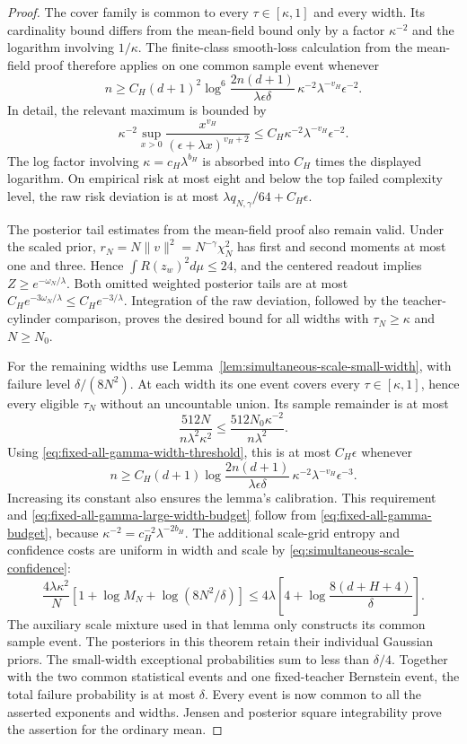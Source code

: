 \begin{proof}
The cover family is common to every $\tau\in[\kappa,1]$ and every
width.  Its cardinality bound differs from the mean-field bound only
by a factor $\kappa^{-2}$ and the logarithm involving $1/\kappa$.
The finite-class smooth-loss calculation from the mean-field proof
therefore applies on one common sample event whenever
\begin{equation}
 n\geq C_H(d+1)^2
    \log^6\!\frac{2n(d+1)}{\lambda\epsilon\delta}\,
                  \kappa^{-2}\lambda^{-v_H}\epsilon^{-2}.
 \label{eq:fixed-all-gamma-large-width-budget}
\end{equation}
In detail, the relevant maximum is bounded by
\[
 \kappa^{-2}\sup_{x>0}
       \frac{x^{v_H}}{(\epsilon+\lambda x)^{v_H+2}}
       \leq C_H\kappa^{-2}\lambda^{-v_H}\epsilon^{-2}.
\]
The log factor involving $\kappa=c_H\lambda^{b_H}$ is absorbed into
$C_H$ times the displayed logarithm.
On empirical risk at most eight and below the top failed complexity
level, the raw risk deviation is at most
$\lambda q_{N,\gamma}/64+C_H\epsilon$.

The posterior tail estimates from the mean-field proof also remain
valid.  Under the scaled prior,
$r_N=N\|v\|^2=N^{-\gamma}\chi_N^2$ has first and second moments
at most one and three.  Hence $\int R(z_w)^2d\mu\leq24$, and the
centered readout implies $Z\geq e^{-\omega_N/\lambda}$.
Both omitted weighted posterior tails are at most
$C_He^{-3\omega_N/\lambda}\leq C_He^{-3/\lambda}$.
Integration of the raw deviation, followed by the teacher-cylinder
comparison, proves the desired bound for all widths with
$\tau_N\geq\kappa$ and $N\geq N_0$.

For the remaining widths use
Lemma~\ref{lem:simultaneous-scale-small-width}, with failure level
$\delta/(8N^2)$.  At each width its one event covers every
$\tau\in[\kappa,1]$, hence every eligible $\tau_N$ without an
uncountable union.  Its sample remainder is at most
\[
 \frac{512N}{n\lambda^2\kappa^2}
     \leq\frac{512N_0\kappa^{-2}}{n\lambda^2}.
\]
Using \eqref{eq:fixed-all-gamma-width-threshold}, this is at most
$C_H\epsilon$ whenever
\[
 n\geq C_H(d+1)
       \log\!\frac{2n(d+1)}{\lambda\epsilon\delta}\,
                     \kappa^{-2}\lambda^{-v_H}\epsilon^{-3}.
\]
Increasing its constant also ensures the lemma's calibration.
This requirement and \eqref{eq:fixed-all-gamma-large-width-budget}
follow from \eqref{eq:fixed-all-gamma-budget}, because
$\kappa^{-2}=c_H^{-2}\lambda^{-2b_H}$.
The additional scale-grid entropy and confidence costs are uniform
in width and scale by \eqref{eq:simultaneous-scale-confidence}:
\[
 \frac{4\lambda\kappa^2}{N}
    [1+\log M_N+\log(8N^2/\delta)]
 \leq4\lambda\left[4+\log\frac{8(d+H+4)}\delta\right].
\]
The auxiliary scale mixture used in that lemma only constructs its
common sample event.  The posteriors in this theorem retain their
individual Gaussian priors.
The small-width exceptional probabilities sum to less than $\delta/4$.
Together with the two common statistical events and one fixed-teacher
Bernstein event, the total failure probability is at most $\delta$.
Every event is now common to all the asserted exponents and widths.
Jensen and posterior square integrability prove the assertion for the
ordinary mean.


\end{proof}
